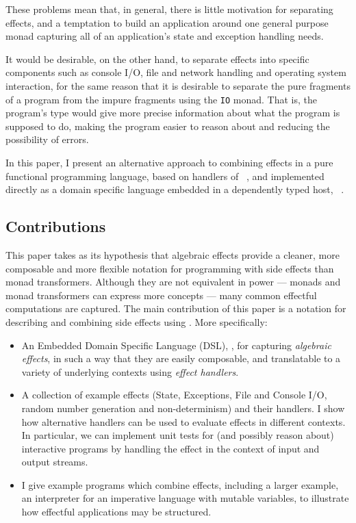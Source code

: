 \noindent
These problems mean that, in general, there is little motivation for separating
effects, and a temptation to build an application around one general purpose
monad capturing all of an application's state and exception handling needs.

It would be desirable, on the other hand, to separate effects into specific
components such as console I/O, file and network handling and operating system
interaction, for the same reason that it is desirable to separate the pure
fragments of a program from the impure fragments using the \texttt{IO} monad.
That is, the program's type would give more precise information about what the
program is supposed to do, making the program easier to reason about and
reducing the possibility of errors.

In this paper, I present an alternative approach to combining effects in
a pure functional programming language, based on handlers of
~\cite{Bauer}, and
implemented directly as a domain specific language embedded
in a dependently typed host, \Idris{}~\cite{Brady2013,idristutorial}.

\subsection{Contributions}

This paper takes as its hypothesis that algebraic effects provide a cleaner,
more composable and more flexible notation for programming with side effects
than monad transformers. Although they are not equivalent in power --- monads
and monad transformers can express more concepts --- many common effectful
computations are captured. 
The main contribution of this paper is a notation for describing and combining
side effects using \Idris{}. More specifically:


\begin{itemize}
\item An Embedded Domain Specific Language (DSL), \Eff{}, for capturing \emph{algebraic
effects}, in such a way that they are easily composable, and translatable to a
variety of underlying contexts using \emph{effect handlers}.
\item A collection of example effects (State, Exceptions,
File and Console I/O, random number generation and
non-determinism) and their handlers. I show how alternative handlers
can be used to evaluate effects in different contexts. In particular, we can
implement unit tests for (and possibly reason about) interactive programs by
handling the effect in the context of input and output streams.
\item I give example programs which combine effects, including a larger
example, an interpreter for an imperative language with mutable variables, to
illustrate how effectful applications may be structured.
\end{itemize}

